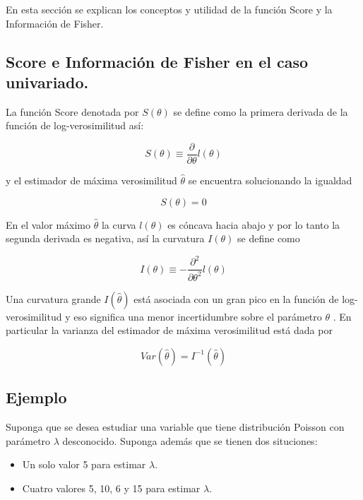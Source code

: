 \documentclass[
]{book}
\providecommand{\tightlist}{%
  \setlength{\itemsep}{0pt}\setlength{\parskip}{0pt}}
\begin{document}
En esta sección se explican los conceptos y utilidad de la función Score y la Información de Fisher.

\hypertarget{score-e-informaciuxf3n-de-fisher-en-el-caso-univariado.}{%
\subsection{Score e Información de Fisher en el caso univariado.}\label{score-e-informaciuxf3n-de-fisher-en-el-caso-univariado.}}

La función Score denotada por \(S(\theta)\) se define como la primera derivada de la función de log-verosimilitud así:

\[
S(\theta) \equiv \frac{\partial}{\partial \theta} l(\theta)
\]

y el estimador de máxima verosimilitud \(\hat{\theta}\) se encuentra solucionando la igualdad

\[
S(\theta) = 0
\]

En el valor máximo \(\hat{\theta}\) la curva \(l(\theta)\) es cóncava hacia abajo y por lo tanto la segunda derivada es negativa, así la curvatura \(I(\theta)\) se define como

\[
I(\theta) \equiv - \frac{\partial^2}{\partial \theta^2} l(\theta)
\]

Una curvatura grande \(I(\hat{\theta})\) está asociada con un gran pico en la función de log-verosimilitud y eso significa una menor incertidumbre sobre el parámetro \(\theta\) \citep{pawitan_2013}. En particular la varianza del estimador de máxima verosimilitud está dada por

\[Var(\hat{\theta})=I^{-1}(\hat{\theta})\]

\hypertarget{ejemplo-52}{%
\subsection*{Ejemplo}\label{ejemplo-52}}

Suponga que se desea estudiar una variable que tiene distribución Poisson con parámetro \(\lambda\) desconocido. Suponga además que se tienen dos situciones:

\begin{itemize}
\tightlist
\item
  Un solo valor 5 para estimar \(\lambda\).
\item
  Cuatro valores 5, 10, 6 y 15 para estimar \(\lambda\).
\end{itemize}
\end{document}
